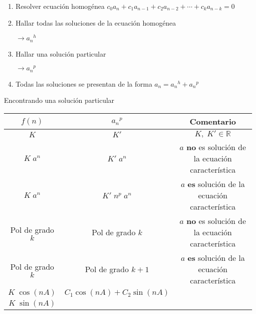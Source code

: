\documentclass[a4paper, twoside]{article}
\begin{document}
	\begin{enumerate}
		\item Resolver ecuación homogénea $c_0a_n + c_1a_{n-1} + c_2a_{n-2} +\cdots+ c_ka_{n-k} =0$
		\item Hallar todas las soluciones de la ecuación  homogénea
		\begin{center}
			$\rightarrow {a_n}^h$
		\end{center}
		\item Hallar una solución particular
		\begin{center}
			$\rightarrow {a_n}^p$
		\end{center}
		\item Todas las soluciones se presentan de la forma $a_n = {a_n}^h + {a_n}^p$
	\end{enumerate}
	
	Encontrando una solución particular
	
	\begin{center}		
			\begin{tabular}{|c|c|c|}
			\hline
			\textbf{$f(n)$} & \textbf{${a_n}^p$} & Comentario \\
			\cline{0 - 1}
			\hline
			$K$ & $K'$ & $K, \;K' \in \mathbb{R}$  \\
			\hline
			$K \; a^n$ & $K' \; a^n$ & $a$ \textbf{no} es solución de la ecuación característica \\
			\hline
			$K \; a^n$ & $K' \; n^p \; a^n$ & $a$ \textbf{es} solución de la ecuación característica \\%
			\hline
			Pol de grado $k$ & Pol de grado $k$ & $a$ \textbf{no} es solución de la ecuación característica \\
			\hline
			Pol de grado $k$ & Pol de grado $k+1$ & $a$ \textbf{es} solución de la ecuación característica \\
			\hline
			$K \; \cos(nA)$ & $C_1 \cos(nA) + C_2 \sin(nA)$ & \\
			$K \; \sin(nA)$ & & \\
			\hline
			\end{tabular}
		\end{center}	

\newpage
\end{document}
